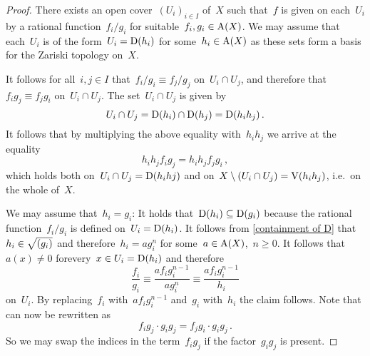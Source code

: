 \begin{proof}
  There exists an open cover~$(U_i)_{i \in I}$ of~$X$ such that~$f$ is given on each~$U_i$ by a rational function~$f_i/g_i$ for suitable~$f_i, g_i \in \operatorname{A}(X)$.
  We may assume that each~$U_i$ is of the form~$U_i = \operatorname{D}(h_i)$ for some~$h_i \in \operatorname{A}(X)$ as these sets form a basis for the Zariski topology on~$X$.
  
  It follows for all~$i,j \in I$ that~$f_i/g_i \equiv f_j/g_j$ on~$U_i \cap U_j$, and therefore that~$f_i g_j \equiv f_j g_i$ on~$U_i \cap U_j$.
  The set~$U_i \cap U_j$ is given by
  \[
    U_i \cap U_j = \operatorname{D}(h_i) \cap \operatorname{D}(h_j) = \operatorname{D}(h_i h_j) \,.
  \]
  It follows that by multiplying the above equality with~$h_i h_j$ we arrive at the equality
  \begin{equation}
  \label{extended equality on intersections}
      h_i h_j f_i g_j
    = h_i h_j f_j g_i \,,
  \end{equation}
  which holds both on~$U_i \cap U_j = \operatorname{D}(h_i hj)$ and on~$X \setminus (U_i \cap U_j) = \operatorname{V}(h_i h_j)$, i.e.\ on the whole of~$X$.
  
  We may assume that~$h_i = g_i$:
  It holds that~$\operatorname{D}(h_i) \subseteq \operatorname{D}(g_i)$ because the rational function~$f_i/g_i$ is defined on~$U_i = \operatorname{D}(h_i)$.
  It follows from \cref{containment of D} that~$h_i \in \sqrt{(g_i)}$ and therefore~$h_i = a g_i^n$ for some~$a \in \operatorname{A}(X)$,~$n \geq 0$.
  It follows that~$a(x) \neq 0$ forevery~$x \in U_i = \operatorname{D}(h_i)$ and therefore 
  \[
            \frac{f_i}{g_i}
    \equiv  \frac{a f_i g_i^{n-1}}{a g_i^n}
    \equiv  \frac{a f_i g_i^{n-1}}{h_i}
  \]
  on~$U_i$.
  By replacing~$f_i$ with~$a f_i g_i^{n-1}$ and~$g_i$ with~$h_i$ the claim follows.
  Note that  can now be rewritten as
  \begin{equation}
  \label{equality on intersections}
        f_i g_j \cdot g_i g_j
      = f_j g_i \cdot g_i g_j \,.
  \end{equation}
  So we may swap the indices in the term~$f_i g_j$ if the factor~$g_i g_j$ is present.
  

\end{proof}
